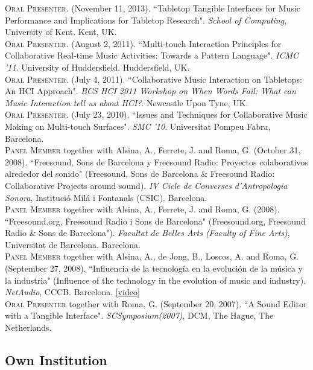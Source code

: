 \documentclass[10pt, a4paper]{article}
\newcommand{\years}[1]{\marginnote{\scriptsize #1}}
\begin{document}
\years{2013} \textsc{Oral Presenter}. (November 11, 2013). “Tabletop Tangible Interfaces for Music Performance and Implications for Tabletop Research". \emph{School of Computing}, University of Kent. Kent, UK.\\
\years{2011b} \textsc{Oral Presenter}. (August 2, 2011). “Multi-touch Interaction Principles for Collaborative Real-time Music Activities: Towards a Pattern Language". \emph{ICMC '11}. University of Huddersfield. Huddersfield, UK.\\
\years{2011a} \textsc{Oral Presenter}. (July 4, 2011). “Collaborative Music Interaction on Tabletops: An HCI Approach". \emph{BCS HCI 2011 Workshop on When Words Fail: What can Music Interaction tell us about HCI?}. Newcastle Upon Tyne, UK.\\
\years{2010} \textsc{Oral Presenter}. (July 23, 2010). “Issues and Techniques for Collaborative Music Making on Multi-touch Surfaces". \emph{SMC '10}. Universitat Pompeu Fabra, Barcelona.\\
\years{2008c} \textsc{Panel Member} together with Alsina, A., Ferrete, J. and Roma, G. (October 31, 2008). “Freesound, Sons de Barcelona y Freesound Radio: Proyectos colaborativos alrededor del sonido" (Freesound, Sons de Barcelona \& Freesound Radio: Collaborative Projects around sound). \emph{IV Cicle de Converses d'Antropologia Sonora}, Institució Milá i Fontanals (CSIC). Barcelona.\\
\years{2008b} \textsc{Panel Member} together with Alsina, A., Ferrete, J. and Roma, G. (2008). “Freesound.org, Freesound Radio i Sons de Barcelona" (Freesound.org, Freesound Radio \& Sons de Barcelona"). \emph{Facultat de Belles Arts (Faculty of Fine Arts)}, Universitat de Barcelona. Barcelona.\\
\years{2008a} \textsc{Panel Member} together with Alsina, A., de Jong, B., Loscos, A. and Roma, G. (September 27, 2008). “Influencia de la tecnología en la evolución de la música y la industria" (Influence of the technology in the evolution of music and industry). \emph{NetAudio}, CCCB. Barcelona. \href{https://www.youtube.com/watch?v=6JlCCvYXrHY}{[video]}\\
\years{2007}\textsc{Oral Presenter} together with Roma, G. (September 20, 2007). “A Sound Editor with a Tangible Interface". \emph{SCSymposium(2007)}, DCM, The Hague, The Netherlands.

\subsection*{Own Institution}
\noindent
\end{document}
